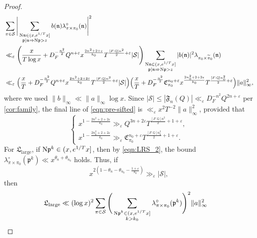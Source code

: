 \documentclass[11pt]{amsart}
\theoremstyle{remark}
\numberwithin{equation}{section}
\newcommand{\p}{\mathfrak{p}}
\newcommand{\n}{\mathfrak{n}}
\newcommand{\F}{\mathfrak{F}}
\newcommand{\N}{\textnormal{N}}
\newcommand{\Q}{\mathbb{Q}}
\newcommand{\mS}{\mathcal{S}}
\newcommand{\eps}{\varepsilon}
\renewcommand{\tilde}{\widetilde}
\renewcommand{\epsilon}{\varepsilon}
\begin{document}
\begin{proof}
\begin{equation}
\label{eqn:pre-sifted}
\begin{aligned}
&\sum_{\pi \in \mS}
    \Bigg| \sum_{\substack{\N \n \in (x, e^{1/T} x] \\ \p \mid \n \Rightarrow \N \p > z}} b(\n) \lambda^\circ_{\pi \times \pi_0}(\n) \Bigg|^2
    \\
    &\ll_{\epsilon}
 \Bigg(\frac{x}{T \log x} + D_F^{-\frac{n^2}{2}}Q^{n+\eps} x^{\frac{2n^2+2+\eps}{k_0}} T^{\frac{[F:\Q]n^2}{2}+\epsilon} 
     |\mS|\Bigg) \sum_{\substack{\N \n \in (x, e^{1/T} x] \\ \p \mid \n \Rightarrow \N \p > z}} |b(\n)|^2 \lambda_{\pi_0 \times \tilde\pi_0}(\n)
    \\
    &\ll_{\epsilon} 
  \Big(\frac{x}{T} + D_F^{-\frac{n^2}{2}}Q^{n+\eps} x^{\frac{2n^2+2+2\eps}{k_0}} T^{\frac{[F:\Q]n^2}{2}+\epsilon} 
     |\mS|\Big) \Big(\frac{x}{T} + D_F^{-\frac{n^2}{2}}\mathfrak{C}_{\pi_0}^{n_0+\eps} x^{\frac{2n_0^2+2+2\eps}{k_0}} T^{\frac{[F:\Q]n_0^2}{2}+\epsilon}\Big) \|a\|_\infty^2,
\end{aligned}
\end{equation}
where we used $\|b\|_\infty \ll \|a\|_\infty \log x$. Since $|\mS| \le |\F_n(Q)| \ll_{\epsilon} D_F^{-n^2}Q^{2n+\epsilon}$ per \cref{cor:family}, the final line of \eqref{eqn:pre-sifted} is $\ll_{\epsilon} x^2 T^{-2} \|a\|_\infty^2$, provided that
\begin{equation}
\label{eqn:required-lower-bound-2}
    \begin{cases} 
    x^{1-\frac{2n^2+2+2\eps}{k_0}} \gg_{\eps} Q^{3n+2\eps} T^{\frac{[F:\Q]n^2}{2} + 1+\epsilon},
    \\
    x^{1-\frac{2n_0^2+2+2\eps}{k_0}} \gg_{\eps} \mathfrak{C}_{\pi_0}^{n_0+\eps} T^{\frac{[F:\Q]n_0^2}{2} + 1+\epsilon}.
    \end{cases}
\end{equation}
For $\mathfrak{L}_{\text{large}}$, if $\N\p^k \in (x, e^{1/T}x]$, then by \eqref{eqn:LRS_2}, the bound $\lambda^\circ_{\pi \times \pi_0}(\p^k) \ll x^{\theta_n+\theta_{n_0}}$ holds.  Thus, if
   \begin{equation} \label{eqn:required-lower-bound-3}
    x^{2(1-\theta_n-\theta_{n_0} - \frac{1+\eps}{k_0})} \gg_{\eps} |\mathcal{S}|,
\end{equation}
then
\[
\begin{aligned}
    \mathfrak{L}_{\text{large}} 
    &\ll (\log x)^2 \sum_{\pi \in \mS}
    \Bigg( \sum_{\substack{\N \p^k \in (x, e^{1/T} x] \\ k > k_0}} \lambda^\circ_{\pi \times \pi_0}(\p^k) \Bigg)^2 \|a\|_\infty^2 

\end{aligned}\]
\end{proof}
\end{document}
